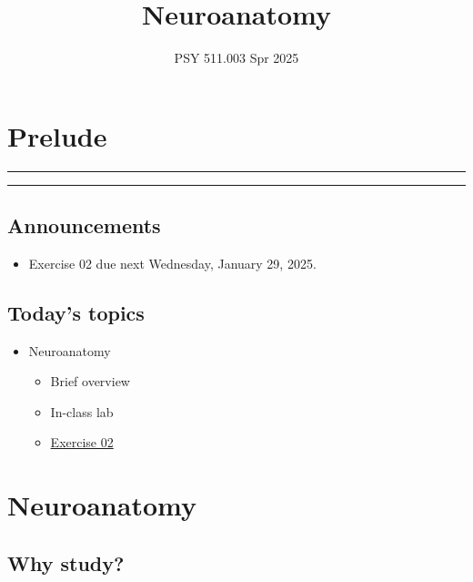 \documentclass[
  letterpaper,
  DIV=11,
  numbers=noendperiod]{scrartcl}
\title{Neuroanatomy}
\subtitle{PSY 511.003 Spr 2025}
\author{}
\date{}
\providecommand{\tightlist}{%
  \setlength{\itemsep}{0pt}\setlength{\parskip}{0pt}}\usepackage{longtable,booktabs,array}
\begin{document}
\maketitle


\section{Prelude}\label{prelude}

\begin{center}\rule{0.5\linewidth}{0.5pt}\end{center}

\begin{center}\rule{0.5\linewidth}{0.5pt}\end{center}

\subsection{Announcements}\label{announcements}

\begin{itemize}
\tightlist
\item
  Exercise 02 {due next Wednesday, January 29, 2025}.
\end{itemize}

\subsection{Today's topics}\label{todays-topics}

\begin{itemize}
\tightlist
\item
  Neuroanatomy

  \begin{itemize}
  \tightlist
  \item
    Brief overview
  \item
    In-class lab
  \item
    \href{../exercises/ex02.qmd}{Exercise 02}
  \end{itemize}
\end{itemize}

\section{Neuroanatomy}\label{neuroanatomy}

\subsection{Why study?}\label{why-study}
\end{document}
